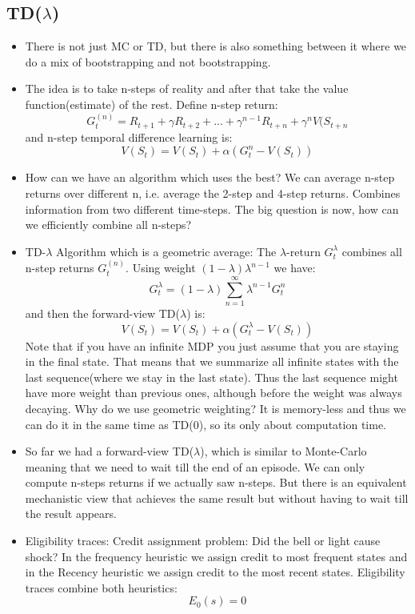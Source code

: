 \documentclass[a4paper]{article}
\begin{document}
\subsection{TD($\lambda$)}
\begin{itemize}
    \item There is not just MC or TD, but there is also something between it where we do a mix of bootstrapping and not bootstrapping. \item The idea is to take n-steps of reality and after that take the value function(estimate) of the rest. Define n-step return: 
    $$G_t^{(n)} = R_{t+1} + \gamma R_{t+2} + ...+ \gamma^{n-1} R_{t+n} + \gamma^n V(S_{t+n}$$ and n-step temporal difference learning is: 
    $$V(S_t) = V(S_t) + \alpha(G_t^n - V(S_t))$$
    \item How can we have an algorithm which uses the best? We can average n-step returns over different n, i.e. average the 2-step and 4-step returns. Combines information from two different time-steps. The big question is now, how can we efficiently combine all n-steps?
    \item TD-$\lambda$ Algorithm which is a geometric average: The $\lambda$-return $G_t^{\lambda}$ combines all n-step returns $G_t^{(n)}$. Using weight $(1-\lambda)\lambda^{n-1}$ we have: $$G_t^{\lambda}= (1-\lambda)\sum_{n=1}^{\infty} \lambda^{n-1}G_t^{n}$$ and then the forward-view TD($\lambda$) is: 
    $$V(S_t) = V(S_t) + \alpha(G_t^{\lambda}-V(S_t))$$
    \newline 
    Note that if you have an infinite MDP you just assume that you are staying in the final state. That means that we summarize all infinite states with the last sequence(where we stay in the last state). Thus the last sequence might have more weight than previous ones, although before the weight was always decaying. 
    \newline
    Why do we use geometric weighting? It is memory-less and thus we can do it in the same time as TD(0), so its only about computation time. 
    \item So far we had a forward-view TD($\lambda$), which is similar to Monte-Carlo meaning that we need to wait till the end of an episode. We can only compute n-steps returns if we actually saw n-steps. But there is an equivalent mechanistic view that achieves the same result but without having to wait till the result appears.
    \item Eligibility traces: Credit assignment problem: Did the bell or light cause shock? In the frequency heuristic we assign credit to most frequent states and in the Recency heuristic we assign credit to the most recent states. Eligibility traces combine both heuristics:$$E_0(s) = 0$$

\end{itemize}
\end{document}
